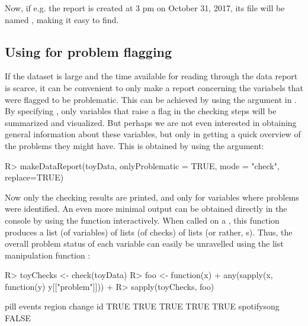 \documentclass[article,shortnames]{jss}
\begin{document}
Now, if e.g. the report is created at 3 pm on October 31, 2017, its file will be named , making it easy to find. 


\subsection[Using dataMaid for problem flagging]{Using  for problem flagging}
If the dataset is large and the time available for reading through the data report is scarce, it can be convenient to only make a report concerning the variabels that were flagged to be problematic. This can be achieved by using the  argument in
. By specifying , only
variables that raise a flag in the checking steps will be summarized
and visualized. But perhaps we are not even interested in obtaining
general information about these variables, but only in getting a quick
overview of the problems they might have. This is obtained by
using the  argument:


\begin{Schunk}
\begin{Sinput}
R> makeDataReport(toyData, onlyProblematic = TRUE, mode = "check", replace=TRUE)
\end{Sinput}
\end{Schunk}

Now only the checking results are printed, and only for variables
where problems were identified. An even more minimal output  can be obtained directly in the console by using the  function interactively. When called on a , this function produces a list (of
variables) of lists (of checks) of lists (or rather,
s). Thus, the overall problem status of each variable
can easily be unravelled using the list manipulation function
:

\begin{Schunk}
\begin{Sinput}
R> toyChecks <- check(toyData)
R> foo <- function(x) {
+    any(sapply(x, function(y) y[["problem"]]))
+  }
R> sapply(toyChecks, foo)
\end{Sinput}
\begin{Soutput}
       pill      events      region      change          id 
       TRUE        TRUE        TRUE        TRUE        TRUE 
spotifysong 
      FALSE 
\end{Soutput}
\end{Schunk}
\end{document}
